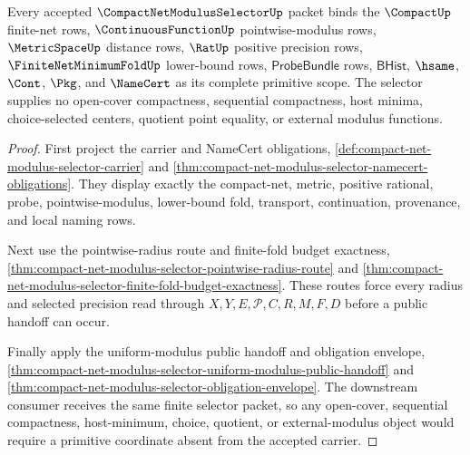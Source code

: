 \begin{theorem}
\label{thm:compact-net-modulus-selector-route-primitive-scope}
Every accepted $\CompactNetModulusSelectorUp$ packet binds the $\CompactUp$ finite-net rows, $\ContinuousFunctionUp$ pointwise-modulus rows, $\MetricSpaceUp$ distance rows, $\RatUp$ positive precision rows, $\FiniteNetMinimumFoldUp$ lower-bound rows, $\mathsf{ProbeBundle}$ rows, $\mathsf{BHist}$, $\hsame$, $\Cont$, $\Pkg$, and $\NameCert$ as its complete primitive scope. The selector supplies no open-cover compactness, sequential compactness, host minima, choice-selected centers, quotient point equality, or external modulus functions.
\end{theorem}
\begin{proof}
First project the carrier and NameCert obligations, \autoref{def:compact-net-modulus-selector-carrier} and \autoref{thm:compact-net-modulus-selector-namecert-obligations}. They display exactly the compact-net, metric, positive rational, probe, pointwise-modulus, lower-bound fold, transport, continuation, provenance, and local naming rows.

Next use the pointwise-radius route and finite-fold budget exactness, \autoref{thm:compact-net-modulus-selector-pointwise-radius-route} and \autoref{thm:compact-net-modulus-selector-finite-fold-budget-exactness}. These routes force every radius and selected precision read through $X,Y,E,\mathcal{P},C,R,M,F,D$ before a public handoff can occur.

Finally apply the uniform-modulus public handoff and obligation envelope, \autoref{thm:compact-net-modulus-selector-uniform-modulus-public-handoff} and \autoref{thm:compact-net-modulus-selector-obligation-envelope}. The downstream consumer receives the same finite selector packet, so any open-cover, sequential compactness, host-minimum, choice, quotient, or external-modulus object would require a primitive coordinate absent from the accepted carrier.
\end{proof}

